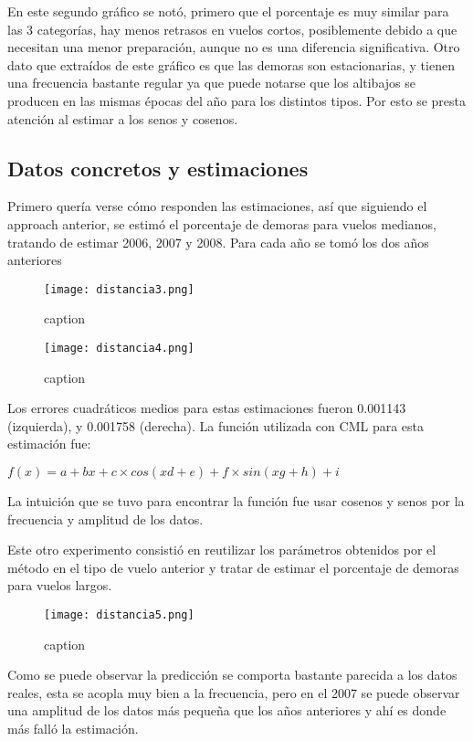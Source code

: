 En este segundo gráfico se notó, primero que el porcentaje es muy similar para las 3 categorías, hay menos retrasos en vuelos cortos, posiblemente debido a que necesitan una menor preparación, aunque no es una diferencia significativa. Otro dato que extraídos de este gráfico es que las demoras son estacionarias, y tienen una frecuencia bastante regular ya que puede notarse que los altibajos se producen en las mismas épocas del año para los distintos tipos. Por esto se presta atención al estimar a los senos y cosenos.


\subsection{Datos concretos y estimaciones}

Primero quería verse cómo responden las estimaciones, así que siguiendo el approach anterior, se estimó el porcentaje de demoras para vuelos medianos, tratando de estimar 2006, 2007 y 2008. Para cada año se tomó los dos años anteriores

\begin{figure}[!htb]
\begin{center}
\texttt{[image: distancia3.png]}
\caption{caption}
\label{label}
\end{center}
\end{figure}

\begin{figure}[!htb]
\begin{center}
\texttt{[image: distancia4.png]}
\caption{caption}
\label{label}
\end{center}
\end{figure}

Los errores cuadráticos medios para estas estimaciones fueron 0.001143 (izquierda), y 0.001758 (derecha). La función utilizada con CML para esta estimación fue:

\bigskip

$f(x) = a + bx + c \times cos(xd + e) + f \times sin(xg + h) + i$

La intuición que se tuvo para encontrar la función fue usar cosenos y senos por la frecuencia y amplitud de los datos.

Este otro experimento consistió en reutilizar los parámetros obtenidos por el método en el tipo de vuelo anterior y tratar de estimar el porcentaje de demoras para vuelos largos.

\begin{figure}[!htb]
\begin{center}
\texttt{[image: distancia5.png]}
\caption{caption}
\label{label}
\end{center}
\end{figure}

Como se puede observar la predicción se comporta bastante parecida a los datos reales, esta se acopla muy bien a la frecuencia, pero en el 2007 se puede observar una amplitud de los datos más pequeña que los años anteriores y ahí es donde más falló la estimación.